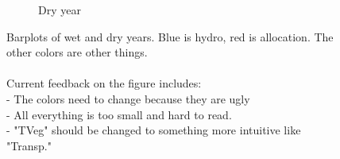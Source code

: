 \begin{figure}[h]
\begin{subfigure}{.5\textwidth}
      \caption{Dry year}
      \label{fig:barplot_dry}
    \end{subfigure}
    \caption{Barplots of wet and dry years. Blue is hydro, red is allocation. The other colors are other things. \\
    \\
    Current feedback on the figure includes:\\
    - The colors need to change because they are ugly\\
    - All everything is too small and hard to read. \\
    - "TVeg" should be changed to something more intuitive like "Transp."
    }
    \label{fig:test}
\end{figure}